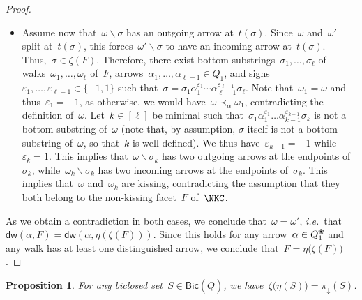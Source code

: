 \documentclass{memo-l}
\newtheorem{proposition}[theorem]{Proposition}
\theoremstyle{definition}
\newcommand{\ssm}{\smallsetminus} %
\newcommand{\ie}{\textit{i.e.}~} %
\newcommand{\blossom}{^\text{\ding{96}}} %
\newcommand{\distinguishedWalk}[2]{\mathsf{dw}(#1,#2)} %
\newcommand{\Bicl}[1]{\mathsf{Bic}(#1)} %
\newcommand{\projDown}{\pi_\downarrow} %
\begin{document}
\begin{proof}
\begin{itemize}
\item Assume now that~$\omega \ssm \sigma$ has an outgoing arrow at~$t(\sigma)$. Since~$\omega$ and~$\omega'$ split at~$t(\sigma)$, this forces~$\omega' \ssm \sigma$ to have an incoming arrow at~$t(\sigma)$. Thus,~${\sigma \! \in \! \zeta(F)}$. Therefore, there exist bottom substrings~$\sigma_1, \dots, \sigma_\ell$ of walks~$\omega_1, \dots, \omega_\ell$ of~$F$, arrows~${\alpha_1, \dots, \alpha_{\ell-1} \in Q_1}$, and signs~$\varepsilon_1, \dots, \varepsilon_{\ell-1} \in \{-1,1\}$ such that~${\sigma = \sigma_1 \alpha_1^{\varepsilon_1} \cdots \alpha_{\ell-1}^{\varepsilon_{\ell-1}} \sigma_\ell}$. Note that~$\omega_1 = \omega$ and thus~$\varepsilon_1 = -1$, as otherwise, we would have~$\omega \prec_\alpha \omega_1$, contradicting the definition of~$\omega$. Let~$k \in [\ell]$ be minimal such that~$\sigma_1 \alpha_1^{\varepsilon_1} \dots \alpha_{k-1}^{\varepsilon_{k-1}} \sigma_k$ is not a bottom substring of~$\omega$ (note that, by assumption, $\sigma$ itself is not a bottom substring of~$\omega$, so that~$k$ is well defined). We thus have~$\varepsilon_{k-1} = -1$ while~$\varepsilon_k = 1$. This implies that~$\omega \ssm \sigma_k$ has two outgoing arrows at the endpoints of~$\sigma_k$, while~$\omega_k \ssm \sigma_k$ has two incoming arrows at the endpoints of~$\sigma_k$. This implies that~$\omega$ and~$\omega_k$ are kissing, contradicting the assumption that they both belong to the non-kissing facet~$F$ of~$\NKC$.
\end{itemize}
As we obtain a contradiction in both cases, we conclude that~$\omega = \omega'$, \ie that ${\distinguishedWalk{\alpha}{F} = \distinguishedWalk{\alpha}{\eta(\zeta(F))}}$.
Since this holds for any arrow~$\alpha \in Q_1\blossom$ and any walk has at least one distinguished arrow, we conclude that~$F = \eta \big( \zeta(F) \big)$.
\end{proof}

\begin{proposition}
\label{prop:section}
For any biclosed set~$S \in \Bicl{\bar Q}$, we have~$\zeta \big( \eta(S) \big) = \projDown(S)$.
\end{proposition}
\end{document}
